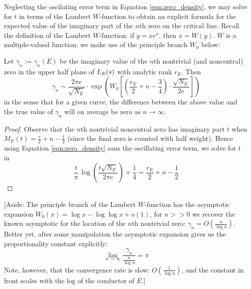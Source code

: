 Neglecting the oscilating error term in Equation \ref{eqn:zero_density}, we may solve for $t$ in terms of the Lambert $W$-function to obtain an explicit formula for the expected value of the imaginary part of the $n$th zero on the critical line. Recall the definition of the Lambert $W$-function: if $y = x e^x$, then $x = W(y)$. $W$ is a multiple-valued function; we make use of the principle branch $W_0$ below:
\begin{corollary}[GRH]\label{cor:gamma_n_approx_value}
Let $\gamma_n := \gamma_n(E)$ be the imaginary value of the $n$th nontrivial (and noncentral) zero in the upper half plane of $L_E(s)$ with analytic rank $r_E$. Then
\begin{equation}\label{approx:gamma_n}
\gamma_n \sim \frac{2\pi e}{\sqrt{N_E}} \cdot \exp \left(W_0\left[\left(\frac{r_E}{2} +n - \frac{3}{4}\right)\cdot \frac{\sqrt{N_E}}{2 e}\right]\right)
\end{equation}
in the sense that for a given curve, the difference between the above value and the true value of $\gamma_n$ will on average be zero as $n \to \infty$.
\end{corollary}
\begin{proof}
Observe that the $n$th nontrivial noncentral zero has imaginary part $t$ when $M_E(t) = \frac{r}{2} + n - \frac{1}{2}$ (since the final zero is counted with half weight). Hence using Equation \ref{eqn:zero_density} sans the oscillating error term, we solve for $t$ in
\begin{equation*}
\frac{t}{\pi} \, \log\left(\frac{t\sqrt{N_E}}{2\pi e}\right) + \frac{1}{4} = \frac{r_E}{2} + n - \frac{1}{2}
\end{equation*}
\end{proof}

[Aside: The principle branch of the Lambert $W$-function has the asymptotic expansion $W_0(x) = \log x - \log \log x + o\left(1\right)$, for $n >> 0$ we recover the known asymptotic for the location of the $n$th nontrivial zero: $\gamma_n = O\left(\frac{n}{\log n} \right)$. Better yet, after some manipulation the asymptotic expansion gives us the proportionality constant explicitly:
\begin{equation}
\lim_{n \to \infty} \frac{\gamma_n}{\frac{n}{\log n}} = \pi
\end{equation}
Note, however, that the convergence rate is slow: $O(\frac{1}{\log n})$, and the constant in front scales with the log of the conductor of $E$.] \\

